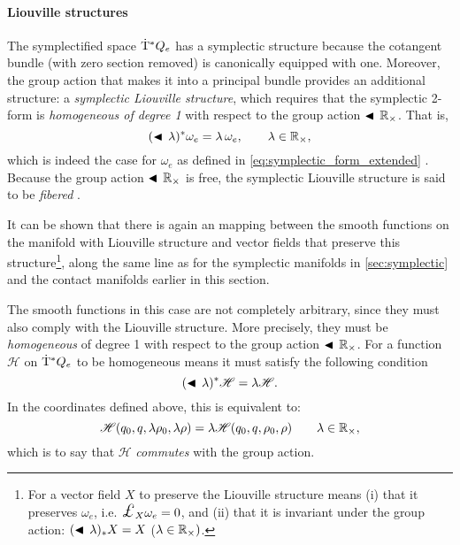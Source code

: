 \paragraph{Liouville structures} The symplectified space \(\mathrm{\dot{T}}^*Q_e\) has a symplectic structure because the cotangent bundle (with zero section removed) is canonically equipped with one. Moreover, the group action that makes it into a principal bundle provides an additional structure: a \emph{symplectic Liouville structure}, which requires that the symplectic 2-form is \emph{homogeneous of degree 1} with respect to the group action \(\blacktriangleleft\,\mathbb{R}_{\times}\). That is,
\begin{equation}
     (\blacktriangleleft\,\lambda)^* \omega_e = \lambda\,\omega_e, \qquad \lambda \in \mathbb{R}_{\times},
\end{equation}
which is indeed the case for \(\omega_e\) as defined in \cref{eq:symplectic_form_extended} \cite{Libermann1987}. Because the group action \(\blacktriangleleft\,\mathbb{R}_{\times}\) is free, the symplectic Liouville structure is said to be \emph{fibered} \cite{Libermann1987}.

It can be shown that there is again an mapping between the smooth functions on the manifold with Liouville structure and vector fields that preserve this structure\footnote
{For a vector field \(X\) to preserve the Liouville structure means (i) that it preserves \(\omega_e\), i.e. \(\lied{X}{\omega_e} = 0\), and (ii) that it is invariant under the group action: \( (\blacktriangleleft\,\lambda)_* X = X\) (\(\lambda \in \mathbb{R}_{\times})\). }, along the same line as for the symplectic manifolds in \cref{sec:symplectic} and the contact manifolds earlier in this section.

The smooth functions in this case are not completely arbitrary, since they must also comply with the Liouville structure. More precisely, they must be \emph{homogeneous} of degree 1 with respect to the group action \(\blacktriangleleft\,\mathbb{R}_{\times}\). For a function \(\mathscr{H}\) on \(\mathrm{\dot{T}}^*Q_e\) to be homogeneous means it must satisfy the following condition
\begin{equation}
     (\blacktriangleleft\,\lambda )^* \mathscr{H} = \lambda \mathscr{H}.
\end{equation}
In the coordinates defined above, this is equivalent to:
\begin{equation}
     \mathscr{H}(q_0, q, \lambda \rho_0, \lambda \rho) = \lambda\mathscr{H}(q_0, q, \rho_0, \rho) \qquad \lambda \in \mathbb{R}_{\times},
\end{equation}
which is to say that \(\mathscr{H}\) \emph{commutes} with the group action.

